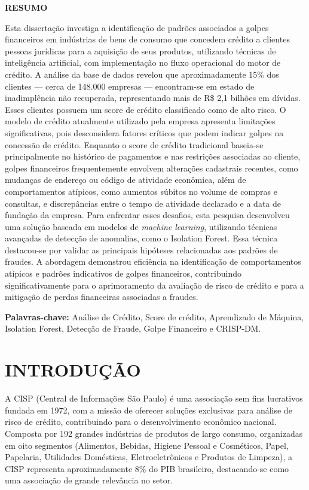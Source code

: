 \documentclass[12pt,a4paper]{article}
\begin{document}
\newpage
\thispagestyle{plain}
\begin{center}
\large
\textbf{RESUMO}
\end{center}
\renewcommand{\baselinestretch}{0.6666666}
Esta dissertação investiga a identificação de padrões associados a golpes financeiros em indústrias de bens de consumo que concedem crédito a clientes pessoas jurídicas para a aquisição de seus produtos, utilizando técnicas de inteligência artificial, com implementação no fluxo operacional do motor de crédito.
A análise da base de dados revelou que aproximadamente 15\% dos clientes — cerca de 148.000 empresas — encontram-se em estado de inadimplência não recuperada, representando mais de R\$ 2,1 bilhões em dívidas. Esses clientes possuem um score de crédito classificado como de alto risco.
O modelo de crédito atualmente utilizado pela empresa apresenta limitações significativas, pois desconsidera fatores críticos que podem indicar golpes na concessão de crédito. Enquanto o score de crédito tradicional baseia-se principalmente no histórico de pagamentos e nas restrições associadas ao cliente, golpes financeiros frequentemente envolvem alterações cadastrais recentes, como mudanças de endereço ou código de atividade econômica, além de comportamentos atípicos, como aumentos súbitos no volume de compras e consultas, e discrepâncias entre o tempo de atividade declarado e a data de fundação da empresa.
Para enfrentar esses desafios, esta pesquisa desenvolveu uma solução baseada em modelos de \textit{machine learning}, utilizando técnicas avançadas de detecção de anomalias, como o Isolation Forest. Essa técnica destacou-se por validar as principais hipóteses relacionadas aos padrões de fraudes. A abordagem demonstrou eficiência na identificação de comportamentos atípicos e padrões indicativos de golpes financeiros, contribuindo significativamente para o aprimoramento da avaliação de risco de crédito e para a mitigação de perdas financeiras associadas a fraudes.
\\[0.5cm]
\begin{flushleft}
{\bf Palavras-chave:} {Análise de Crédito, Score de crédito, Aprendizado de Máquina, Isolation Forest, Detecção de Fraude, Golpe Financeiro e CRISP-DM.}
\end{flushleft}

\newpage
\thispagestyle{empty}
\tableofcontents

\newpage
\pagestyle{plain}
\renewcommand{\baselinestretch}{1.5}
\normalsize
\section{INTRODUÇÃO}
A CISP (Central de Informações São Paulo) é uma associação sem fins lucrativos fundada em 1972, com a missão de oferecer soluções exclusivas para análise de risco de crédito, contribuindo para o desenvolvimento econômico nacional. Composta por 192 grandes indústrias de produtos de largo consumo, organizadas em oito segmentos (Alimentos, Bebidas, Higiene Pessoal e Cosméticos, Papel, Papelaria, Utilidades Domésticas, Eletroeletrônicos e Produtos de Limpeza), a CISP representa aproximadamente 8\% do PIB brasileiro, destacando-se como uma associação de grande relevância no setor.
\end{document}

